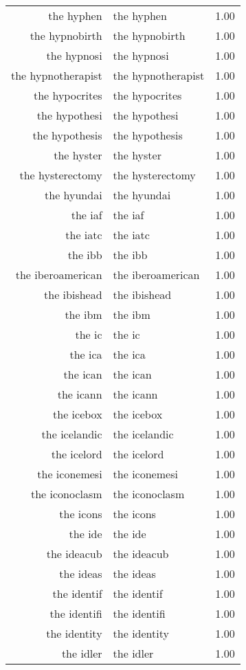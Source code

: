 \begin{table}[ht]
\begin{tabular}{rlr}
  the hyphen & the hyphen & 1.00 \\ 
  the hypnobirth & the hypnobirth & 1.00 \\ 
  the hypnosi & the hypnosi & 1.00 \\ 
  the hypnotherapist & the hypnotherapist & 1.00 \\ 
  the hypocrites & the hypocrites & 1.00 \\ 
  the hypothesi & the hypothesi & 1.00 \\ 
  the hypothesis & the hypothesis & 1.00 \\ 
  the hyster & the hyster & 1.00 \\ 
  the hysterectomy & the hysterectomy & 1.00 \\ 
  the hyundai & the hyundai & 1.00 \\ 
  the iaf & the iaf & 1.00 \\ 
  the iatc & the iatc & 1.00 \\ 
  the ibb & the ibb & 1.00 \\ 
  the iberoamerican & the iberoamerican & 1.00 \\ 
  the ibishead & the ibishead & 1.00 \\ 
  the ibm & the ibm & 1.00 \\ 
  the ic & the ic & 1.00 \\ 
  the ica & the ica & 1.00 \\ 
  the ican & the ican & 1.00 \\ 
  the icann & the icann & 1.00 \\ 
  the icebox & the icebox & 1.00 \\ 
  the icelandic & the icelandic & 1.00 \\ 
  the icelord & the icelord & 1.00 \\ 
  the iconemesi & the iconemesi & 1.00 \\ 
  the iconoclasm & the iconoclasm & 1.00 \\ 
  the icons & the icons & 1.00 \\ 
  the ide & the ide & 1.00 \\ 
  the ideacub & the ideacub & 1.00 \\ 
  the ideas & the ideas & 1.00 \\ 
  the identif & the identif & 1.00 \\ 
  the identifi & the identifi & 1.00 \\ 
  the identity & the identity & 1.00 \\ 
  the idler & the idler & 1.00 \\ 

\end{tabular}
\end{table}
